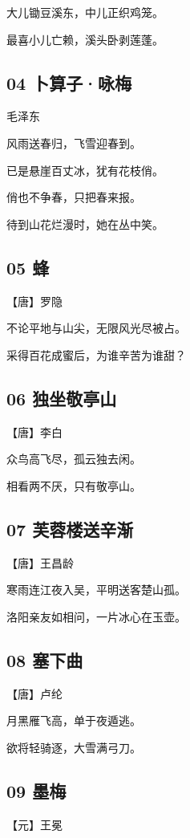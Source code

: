 \documentclass[a6paper, 12pt]{article}
\begin{document}
大儿锄豆溪东，中儿正织鸡笼。

最喜小儿亡赖，溪头卧剥莲蓬。

\subsection*{04 卜算子·咏梅}

毛泽东

风雨送春归，飞雪迎春到。

已是悬崖百丈冰，犹有花枝俏。

俏也不争春，只把春来报。

待到山花烂漫时，她在丛中笑。

\subsection*{05 蜂}

【唐】罗隐

不论平地与山尖，无限风光尽被占。

采得百花成蜜后，为谁辛苦为谁甜？

\subsection*{06 独坐敬亭山}

【唐】李白

众鸟高飞尽，孤云独去闲。

相看两不厌，只有敬亭山。

\subsection*{07 芙蓉楼送辛渐}

【唐】王昌龄

寒雨连江夜入吴，平明送客楚山孤。

洛阳亲友如相问，一片冰心在玉壶。

\subsection*{08 塞下曲}

【唐】卢纶

月黑雁飞高，单于夜遁逃。

欲将轻骑逐，大雪满弓刀。

\subsection*{09 墨梅}

【元】王冕
\end{document}
